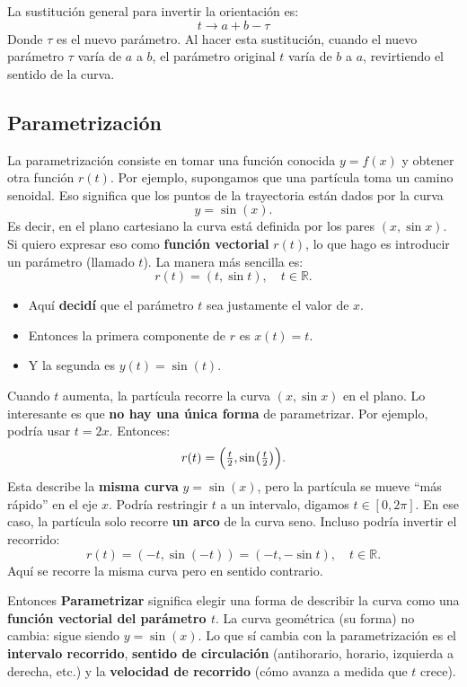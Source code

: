 La sustitución general para invertir la orientación es:
$$
t \longrightarrow a+b-\tau
$$
Donde $\tau$ es el nuevo parámetro. Al hacer esta sustitución, cuando el nuevo parámetro $\tau$ varía de $a$ a $b$, el parámetro original $t$ varía de $b$ a $a$, revirtiendo el sentido de la curva.

\subsection{Parametrización}

La parametrización consiste en tomar una función conocida $y=f(x)$ y obtener otra función $r(t)$. Por ejemplo, supongamos que una partícula toma un camino senoidal. Eso significa que los puntos de la trayectoria están dados por la curva
$$
y = \sin(x).
$$
Es decir, en el plano cartesiano la curva está definida por los pares $(x, \sin x)$. Si quiero expresar eso como \textbf{función vectorial} $r(t)$, lo que hago es introducir un parámetro (llamado $t$). La manera más sencilla es:
$$
r(t) = (t, \sin t), \quad t\in \mathbb{R}.
$$
\begin{itemize}
\item Aquí \textbf{decidí} que el parámetro $t$ sea justamente el valor de $x$.
\item Entonces la primera componente de $r$ es $x(t)=t$.
\item Y la segunda es $y(t)=\sin(t)$.
\end{itemize}
Cuando $t$ aumenta, la partícula recorre la curva $(x,\sin x)$ en el plano. Lo interesante es que \textbf{no hay una única forma} de parametrizar. Por ejemplo, podría usar $t=2x$. Entonces:
$$
r(t) = \Bigl(\tfrac{t}{2}, \sin\bigl(\tfrac{t}{2}\bigr)\Bigr).
$$
Esta describe la \textbf{misma curva} $y=\sin(x)$, pero la partícula se mueve ``más rápido'' en el eje $x$. Podría restringir $t$ a un intervalo, digamos $t\in[0,2\pi]$. En ese caso, la partícula solo recorre \textbf{un arco} de la curva seno. Incluso podría invertir el recorrido:
$$
r(t) = (-t, \sin(-t)) = (-t, -\sin t), \quad t\in\mathbb{R}.
$$
Aquí se recorre la misma curva pero en sentido contrario.

Entonces \textbf{Parametrizar} significa elegir una forma de describir la curva como una \textbf{función vectorial del parámetro $t$}. La curva geométrica (su forma) no cambia: sigue siendo $y=\sin(x)$. Lo que sí cambia con la parametrización es el \textbf{intervalo recorrido}, \textbf{sentido de circulación} (antihorario, horario, izquierda a derecha, etc.) y la \textbf{velocidad de recorrido} (cómo avanza a medida que $t$ crece).

